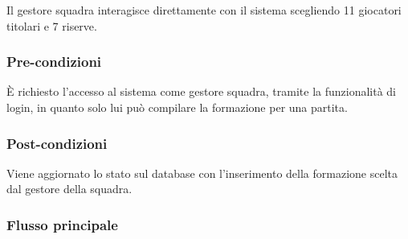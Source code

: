 Il gestore squadra interagisce direttamente con il sistema scegliendo 11 giocatori titolari e 7 riserve.

\subsubsection*{Pre-condizioni}
È richiesto l'accesso al sistema come gestore squadra, tramite la funzionalità di login, in quanto solo lui può compilare la formazione per una partita.

\subsubsection*{Post-condizioni}
Viene aggiornato lo stato sul database con l'inserimento della formazione scelta dal gestore della squadra.

\subsubsection*{Flusso principale}

